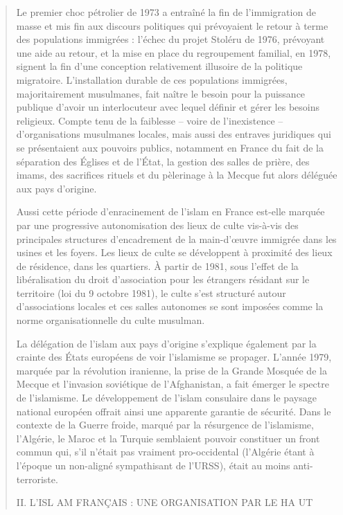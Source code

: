 \begin{quote}
Le premier choc pétrolier de 1973 a entraîné la fin de l'immigration de
masse et mis fin aux discours politiques qui prévoyaient le retour à
terme des populations immigrées : l'échec du projet Stoléru de 1976,
prévoyant une aide au retour, et la mise en place du regroupement
familial, en 1978, signent la fin d'une conception relativement
illusoire de la politique migratoire. L'installation durable de ces
populations immigrées, majoritairement musulmanes, fait naître le besoin
pour la puissance publique d'avoir un interlocuteur avec lequel définir
et gérer les besoins religieux. Compte tenu de la faiblesse -- voire de
l'inexistence -- d'organisations musulmanes locales, mais aussi des
entraves juridiques qui se présentaient aux pouvoirs publics, notamment
en France du fait de la séparation des Églises et de l'État, la gestion
des salles de prière, des imams, des sacrifices rituels et du pèlerinage
à la Mecque fut alors déléguée aux pays d'origine.

Aussi cette période d'enracinement de l'islam en France est-elle marquée
par une progressive autonomisation des lieux de culte vis-à-vis des
principales structures d'encadrement de la main-d'œuvre immigrée dans
les usines et les foyers. Les lieux de culte se développent à proximité
des lieux de résidence, dans les quartiers. À partir de 1981, sous
l'effet de la libéralisation du droit d'association pour les étrangers
résidant sur le territoire (loi du 9 octobre 1981), le culte s'est
structuré autour d'associations locales et ces salles autonomes se sont
imposées comme la norme organisationnelle du culte musulman.

La délégation de l'islam aux pays d'origine s'explique également par la
crainte des États européens de voir l'islamisme se propager. L'année
1979, marquée par la révolution iranienne, la prise de la Grande Mosquée
de la Mecque et l'invasion soviétique de l'Afghanistan, a fait émerger
le spectre de l'islamisme. Le développement de l'islam consulaire dans
le paysage national européen offrait ainsi une apparente garantie de
sécurité. Dans le contexte de la Guerre froide, marqué par la résurgence
de l'islamisme, l'Algérie, le Maroc et la Turquie semblaient pouvoir
constituer un front commun qui, s'il n'était pas vraiment pro-occidental
(l'Algérie étant à l'époque un non-aligné sympathisant de l'URSS), était
au moins anti-terroriste.

II. L'ISL AM FRANÇAIS : UNE ORGANISATION PAR LE HA UT
\end{quote}

